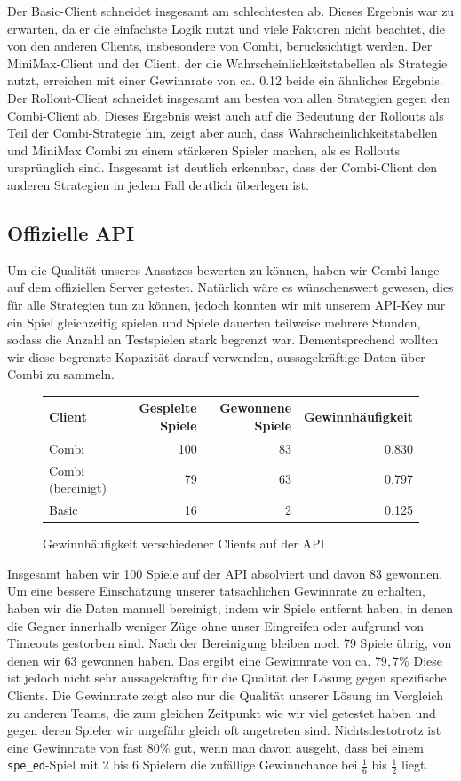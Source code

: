 \documentclass[12pt,a4paper]{article}
\begin{document}
Der Basic-Client schneidet insgesamt am schlechtesten ab. Dieses Ergebnis war zu erwarten, da er die einfachste Logik nutzt und viele Faktoren nicht beachtet, die von den anderen Clients, insbesondere von Combi, berücksichtigt werden. Der MiniMax-Client und der Client, der die Wahrscheinlichkeitstabellen als Strategie nutzt, erreichen mit einer Gewinnrate von ca. 0.12 beide ein ähnliches Ergebnis. Der Rollout-Client schneidet insgesamt am besten von allen Strategien gegen den Combi-Client ab. Dieses Ergebnis weist auch auf die Bedeutung der Rollouts als Teil der Combi-Strategie hin, zeigt aber auch, dass Wahrscheinlichkeitstabellen und MiniMax Combi zu einem stärkeren Spieler machen, als es Rollouts ursprünglich sind. Insgesamt ist deutlich erkennbar, dass der Combi-Client den anderen Strategien in jedem Fall deutlich überlegen ist.
 
\subsection{Offizielle API}
Um die Qualität unseres Ansatzes bewerten zu können, haben wir Combi lange auf dem offiziellen Server getestet.
Natürlich wäre es wünschenswert gewesen, dies für alle Strategien tun zu können, jedoch konnten wir mit unserem API-Key nur ein Spiel gleichzeitig spielen und Spiele dauerten teilweise mehrere Stunden, sodass die Anzahl an Testspielen stark begrenzt war. Dementsprechend wollten wir diese begrenzte Kapazität darauf verwenden, aussagekräftige Daten über Combi zu sammeln.

\begin{figure}[h]
    \centering
    \begin{tabular}{l|r|r|r}
        Client & Gespielte Spiele & Gewonnene Spiele & Gewinnhäufigkeit \\ \hline \hline
        Combi & 100 & 83 & 0.830 \\ \hline
        Combi (bereinigt) & 79 & 63 & 0.797 \\ \hline
        Basic & 16 & 2 & 0.125 \\
    \end{tabular}
    \caption{Gewinnhäufigkeit verschiedener Clients auf der API}
    \label{fig:api-testing}
\end{figure}

Insgesamt haben wir 100 Spiele auf der API absolviert und davon 83 gewonnen. Um eine bessere Einschätzung unserer tatsächlichen Gewinnrate zu erhalten, haben wir die Daten manuell bereinigt, indem wir Spiele entfernt haben, in denen die Gegner innerhalb weniger Züge ohne unser Eingreifen oder aufgrund von Timeouts gestorben sind. Nach der Bereinigung bleiben noch 79 Spiele übrig, von denen wir 63 gewonnen haben. Das ergibt eine Gewinnrate von ca. $79,7\%$ Diese ist jedoch nicht sehr aussagekräftig für die Qualität der Lösung gegen spezifische Clients. Die Gewinnrate zeigt also nur die Qualität unserer Lösung im Vergleich zu anderen Teams, die zum gleichen Zeitpunkt wie wir viel getestet haben und gegen deren Spieler wir ungefähr gleich oft angetreten sind. Nichtsdestotrotz ist eine Gewinnrate von fast 80\% gut, wenn man davon ausgeht, dass bei einem \texttt{spe\_ed}-Spiel mit 2 bis 6 Spielern die zufällige Gewinnchance bei $\frac{1}{6}$ bis $\frac{1}{2}$ liegt.
\end{document}
